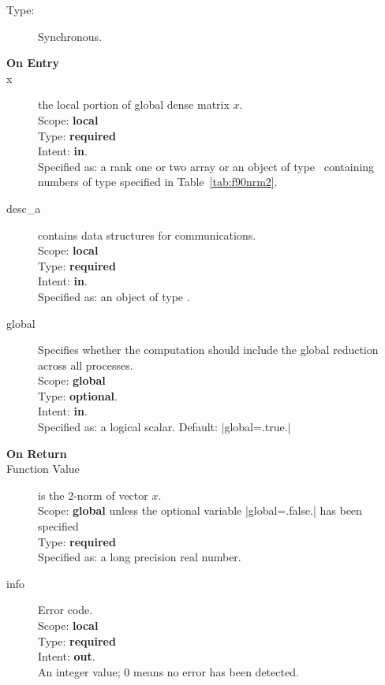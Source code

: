 \begin{description}
\item[Type:] Synchronous.
\item[\bf On Entry]
\item[x] the local portion of global dense matrix
$x$.%
\\
Scope: {\bf local} \\
Type: {\bf required} \\
Intent: {\bf in}.\\
Specified as:  a rank one or two array or an object of type \vdata\
containing numbers of type specified in
Table~\ref{tab:f90nrm2}.
\item[desc\_a] contains data structures for communications.\\
Scope: {\bf local} \\
Type: {\bf required}\\
Intent: {\bf in}.\\
Specified as: an object of type \descdata.
\item[global]  Specifies whether the computation should include the
  global reduction across all processes.\\
Scope: {\bf global} \\
Type: {\bf optional}.\\
Intent: {\bf in}.\\
Specified as: a logical scalar.
Default: \fortinline|global=.true.|\\%

\item[\bf On Return]
\item[Function Value] is the 2-norm of vector $x$.\\
Scope: {\bf global} unless the optional variable
\fortinline|global=.false.| has been specified\\
Type: {\bf required} \\
Specified as: a long precision real number.
\item[info] Error code.\\
Scope: {\bf local} \\
Type: {\bf required} \\
Intent: {\bf out}.\\
An integer value; 0 means no error has been detected.
\end{description}

